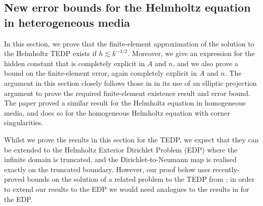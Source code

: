 \subsection{New error bounds for the Helmholtz equation in heterogeneous media}\label{sec:heterr}
In this section, we prove that the finite-element approximation of the solution to the Helmholtz TEDP exists if $ h \lesssim k^{-3/2}.$ Moreover, we give an expression for the hidden constant that is completely explicit in $A$ and $n$, and we also prove a bound on the finite-element error, again completely explicit in $A$ and $n$. The argument in this section closely follows those in \cite{FeWu:11,ChNi:18} in its use of an elliptic projection argument to prove the required finite-element existence result and error bound. The paper \cite{FeWu:11} proved a similar result for the Helmholtz equation in homogeneous media, and \cite{ChNi:18} does so for the homogeneous Helmholtz equation with corner singularities.

Whilst we prove the results in this section for the TEDP, we expect that they can be extended to the Helmholtz Exterior Dirichlet Problem (EDP) where the infinite domain is truncated, and the Dirichlet-to-Neumann map is realised exactly on the truncated boundary. However, our proof below uses recently-proved bounds on the solution of a related problem to the TEDP from \cite{ChNiTo:18}; in order to extend our results to the EDP we would need analogues to the results in \cite{ChNiTo:18} for the EDP.



